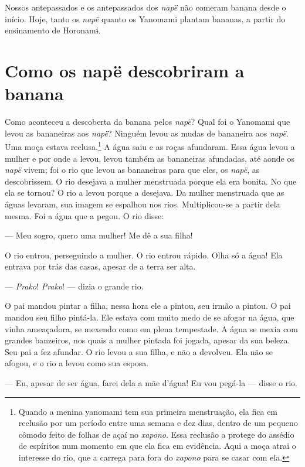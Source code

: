 Nossos antepassados e os antepassados dos \textit{napë} não comeram banana
desde o início. Hoje, tanto os \textit{napë} quanto os Yanomami plantam
bananas, a partir do ensinamento de Horonamɨ.

\section{Como os napë descobriram a banana}

Como aconteceu a descoberta da banana pelos \textit{napë}? Qual foi o
Yanomami que levou as bananeiras aos \textit{napë}? Ninguém levou as mudas
de bananeira aos \textit{napë}. Uma moça estava reclusa.\footnote{Quando a menina yanomami tem sua primeira menstruação, ela fica em
reclusão por um período entre uma semana e dez dias, dentro de um
pequeno cômodo feito de folhas de açaí no \textit{xapono}. Essa reclusão a
protege do assédio de espíritos num momento em que ela fica em
evidência. Aqui a moça atrai o interesse do rio, que a carrega para fora
do \textit{xapono} para se casar com ela.} A água saiu
e as roças afundaram. Essa água levou a mulher e por onde a levou, levou
também as bananeiras afundadas, até aonde os \textit{napë} vivem; foi o
rio que levou as bananeiras para que eles, os \textit{napë}, as
descobrissem. O rio desejava a mulher menstruada porque ela era bonita.
No que ela se tornou? O rio a levou porque a desejava. Da mulher
menstruada que as águas levaram, sua imagem se espalhou nos rios.
Multiplicou-se a partir dela mesma. Foi a água que a pegou. O rio
disse: 

--- Meu sogro, quero uma mulher! Me dê a sua filha! 

O rio entrou, perseguindo a mulher. O rio entrou rápido. Olha só a água!
 Ela entrava por trás das casas, apesar de a terra ser alta. 

--- \textit{Prako}! \textit{Prako}! --- dizia o grande rio. 

O pai mandou pintar a filha, nessa hora ele a pintou, seu irmão a
 pintou. O pai mandou seu filho pintá-la. Ele estava com muito medo de se
 afogar na água, que vinha ameaçadora, se mexendo como em plena
 tempestade. A água se mexia com grandes banzeiros, nos quais a mulher pintada foi
 jogada, apesar da sua beleza. Seu pai a fez afundar. O rio levou a sua filha, e não a devolveu. Ela não se afogou, e o rio a
 levou como sua esposa. 

--- Eu, apesar de ser água, farei dela a mãe d'água! Eu vou pegá-la ---
disse o rio. 

